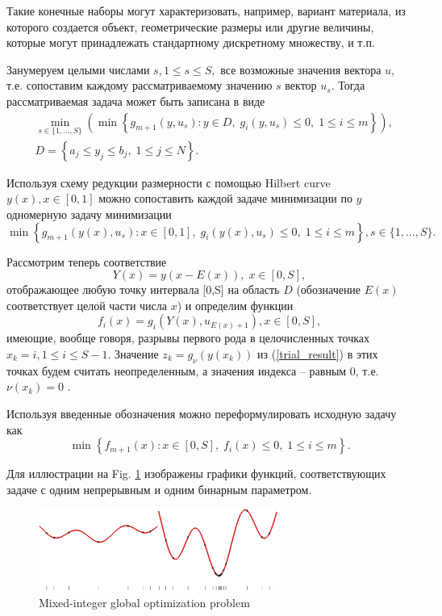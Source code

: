 \documentclass[
11pt,%
tightenlines,%
twoside,%
onecolumn,%
nofloats,%
nobibnotes,%
nofootinbib,%
superscriptaddress,%
noshowpacs,%
centertags]%
{revtex4}
\begin{document}
Такие конечные наборы могут характеризовать, например, вариант материала, из которого создается объект, геометрические размеры или другие величины, которые могут принадлежать стандартному дискретному множеству, и т.п.

Занумеруем целыми числами $s, 1\leq s \leq S,$ все возможные значения вектора $u$, т.е. сопоставим каждому рассматриваемому значению $s$ вектор $u_s$. 
Тогда рассматриваемая задача может быть записана в виде 
\begin{eqnarray}\label{problem_is}
& \min_{s\in\{1,...,S\}}\left(\min{\left\{ g_{m+1}(y,u_s):y\in D, \; g_i(y,u_s)\leq 0, \; 1 \leq i \leq m\right\}}\right),\\
& D=\left\{ a_j\leq y_j \leq b_j, \; 1 \leq j\leq N \right\}.\nonumber 
\end{eqnarray}

Используя схему редукции размерности с помощью Hilbert curve $y(x), x\in [0,1]$ можно сопоставить каждой задаче минимизации по $y$ одномерную задачу минимизации
\[
 \min{\left\{ g_{m+1}(y(x),u_s):x \in [0,1], \; g_i(y(x),u_s)\leq 0, \; 1 \leq i \leq m\right\}}, s\in\{1,...,S\}.
\]

Рассмотрим теперь соответствие 
\[
Y(x)=y(x-E(x)), \; x\in[0,S],
\]
отображающее любую точку интервала [0,S] на область $D$ (обозначение $E(x)$ соответствует целой части числа $x$) и определим функции 
\[
f_i(x) = g_i(Y(x),u_{E(x)+1}), x\in[0,S],
\]
имеющие, вообще говоря, разрывы первого рода в целочисленных точках $x_k = i, 1\leq i \leq S-1$.
Значение  $z_k = g_\nu(y(x_k))$ из (\ref{trial_result}) в этих точках будем считать неопределенным, а значения индекса -- равным 0, т.е. $\nu(x_k) = 0$ .

Используя введенные обозначения можно переформулировать исходную задачу как
\begin{equation}\label{problem_is1}
\min \left\{f_{m+1}(x): x \in [0,S], \; f_i(x) \leq 0, \; 1 \leq i \leq m\right\}.
\end{equation}

Для иллюстрации на Fig. \ref{fig:1}  изображены графики функций, соответствующих задаче с одним непрерывным и одним бинарным параметром.
\begin{figure}[ht]
    \centering
    \includegraphics[width=0.7\textwidth]{fig1.jpg}
    \caption{Mixed-integer global optimization problem}
    \label{fig:1}
\end{figure}
\end{document}
